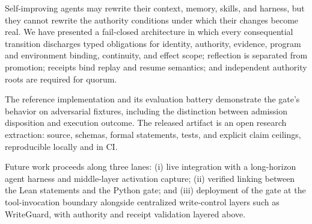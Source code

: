 Self-improving agents may rewrite their context, memory, skills, and
harness, but they cannot rewrite the authority conditions under which
their changes become real. We have presented a fail-closed architecture in
which every consequential transition discharges typed obligations for
identity, authority, evidence, program and environment binding,
continuity, and effect scope; reflection is separated from promotion;
receipts bind replay and resume semantics; and independent authority roots
are required for quorum.

The reference implementation and its evaluation battery demonstrate the
gate's behavior on adversarial fixtures, including the distinction between
admission disposition and execution outcome. The released artifact is an
open research extraction: source, schemas, formal statements, tests, and
explicit claim ceilings, reproducible locally and in CI.

Future work proceeds along three lanes: (i) live integration with a
long-horizon agent harness and middle-layer activation capture; (ii)
verified linking between the Lean statements and the Python gate; and
(iii) deployment of the gate at the tool-invocation boundary alongside
centralized write-control layers such as WriteGuard, with authority and
receipt validation layered above.
